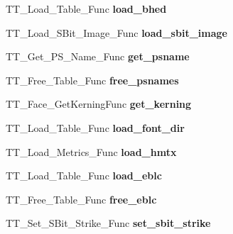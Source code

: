\begin{DoxyCompactItemize}
T\+T\+\_\+\+Load\+\_\+\+Table\+\_\+\+Func {\bfseries load\+\_\+bhed}
\item 
\mbox{\label{struct_s_f_n_t___interface___ac0c68f047a4dbe7467ae422cd810e917}} 
T\+T\+\_\+\+Load\+\_\+\+S\+Bit\+\_\+\+Image\+\_\+\+Func {\bfseries load\+\_\+sbit\+\_\+image}
\item 
\mbox{\label{struct_s_f_n_t___interface___a08c388ef2f20f9452600fffeaf051183}} 
T\+T\+\_\+\+Get\+\_\+\+P\+S\+\_\+\+Name\+\_\+\+Func {\bfseries get\+\_\+psname}
\item 
\mbox{\label{struct_s_f_n_t___interface___a4d73e810a4e0bc018b7ca935822e4eec}} 
T\+T\+\_\+\+Free\+\_\+\+Table\+\_\+\+Func {\bfseries free\+\_\+psnames}
\item 
\mbox{\label{struct_s_f_n_t___interface___a73b00cba7226978783efdcc928330eb9}} 
T\+T\+\_\+\+Face\+\_\+\+Get\+Kerning\+Func {\bfseries get\+\_\+kerning}
\item 
\mbox{\label{struct_s_f_n_t___interface___a30af6672f274638bb0b0c7546e58d470}} 
T\+T\+\_\+\+Load\+\_\+\+Table\+\_\+\+Func {\bfseries load\+\_\+font\+\_\+dir}
\item 
\mbox{\label{struct_s_f_n_t___interface___aea4dd40109dec64e4feb53462d3a54d0}} 
T\+T\+\_\+\+Load\+\_\+\+Metrics\+\_\+\+Func {\bfseries load\+\_\+hmtx}
\item 
\mbox{\label{struct_s_f_n_t___interface___a2b6d7cb72644cc5e36ca67e4aeed55e1}} 
T\+T\+\_\+\+Load\+\_\+\+Table\+\_\+\+Func {\bfseries load\+\_\+eblc}
\item 
\mbox{\label{struct_s_f_n_t___interface___a043a22a8dd45b30dc6e8e5cb7be8dc44}} 
T\+T\+\_\+\+Free\+\_\+\+Table\+\_\+\+Func {\bfseries free\+\_\+eblc}
\item 
\mbox{\label{struct_s_f_n_t___interface___ab9e73d79753ea4a492c1cf66aee8e518}} 
T\+T\+\_\+\+Set\+\_\+\+S\+Bit\+\_\+\+Strike\+\_\+\+Func {\bfseries set\+\_\+sbit\+\_\+strike}
\item 

\end{DoxyCompactItemize}

